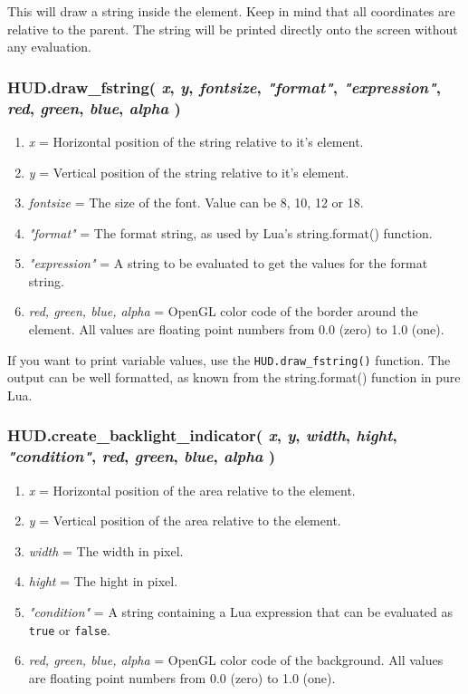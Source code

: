 \documentclass[11pt,parskip=half,a4paper]{scrartcl}
\begin{document}
This will draw a string inside the element. Keep in mind that all coordinates are relative to the parent. The string will be printed directly onto the screen without any evaluation.

\subsubsection{HUD.draw\_fstring( \emph{x}, \emph{y}, \emph{fontsize}, \emph{"format"}, \emph{"expression"}, \emph{red}, \emph{green}, \emph{blue}, \emph{alpha} )}

\begin{enumerate}
	\item \emph{x} = Horizontal position of the string relative to it's element.
	\item \emph{y} = Vertical position of the string relative to it's element.
	\item \emph{fontsize} = The size of the font. Value can be 8, 10, 12 or 18.
	\item \emph{"format"} = The format string, as used by Lua's string.format() function.
	\item \emph{"expression"} = A string to be evaluated to get the values for the format string.
	\item \emph{red, green, blue, alpha} = OpenGL color code of the border around the element. All values are floating point numbers from 0.0 (zero) to 1.0 (one).
\end{enumerate}

If you want to print variable values, use the \verb|HUD.draw_fstring()| function. The output can be well formatted, as known from the string.format() function in pure Lua.

\subsubsection{HUD.create\_backlight\_indicator( \emph{x}, \emph{y}, \emph{width}, \emph{hight}, \emph{"condition"}, \emph{red}, \emph{green}, \emph{blue}, \emph{alpha} )}

\begin{enumerate}
	\item \emph{x} = Horizontal position of the area relative to the element.
	\item \emph{y} = Vertical position of the area relative to the element.
	\item \emph{width} = The width in pixel.
	\item \emph{hight} = The hight in pixel.
	\item \emph{"condition"} = A string containing a Lua expression that can be evaluated as \verb|true| or \verb|false|.
	\item \emph{red, green, blue, alpha} = OpenGL color code of the background. All values are floating point numbers from 0.0 (zero) to 1.0 (one).
\end{enumerate}
\end{document}
